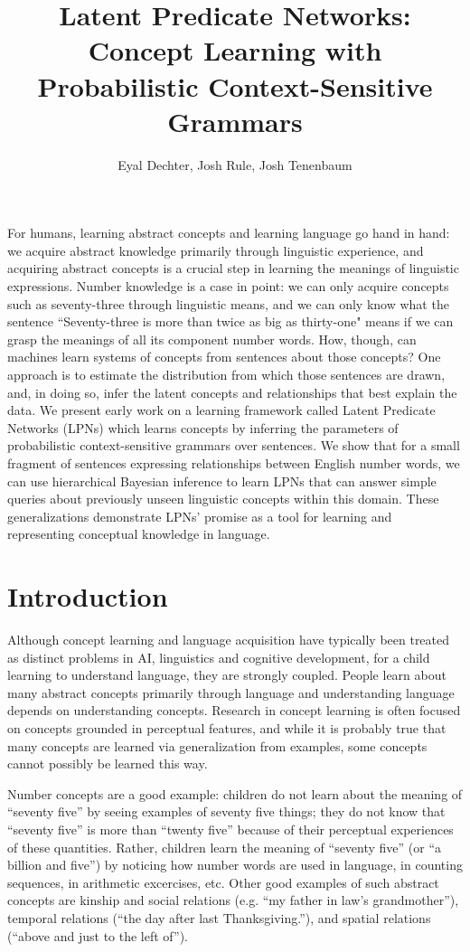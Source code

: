\documentclass[11pt, twocolumn]{article}
\title{Latent Predicate Networks: Concept Learning with Probabilistic Context-Sensitive Grammars}
\author{Eyal Dechter,  Josh Rule, Josh Tenenbaum}
\begin{document}
\vspace{-10cm}
\maketitle

{\small For humans, learning abstract concepts and learning language
  go hand in hand: we acquire abstract knowledge primarily through
  linguistic experience, and acquiring abstract concepts is a crucial
  step in learning the meanings of linguistic expressions. Number
  knowledge is a case in point: we can only acquire concepts such as
  seventy-three through linguistic means, and we can only know what
  the sentence ``Seventy-three is more than twice as big as thirty-one"
  means if we can grasp the meanings of all its component number
  words. How, though, can machines learn systems of concepts from
  sentences about those concepts? One approach is to estimate the
  distribution from which those sentences are drawn, and, in doing so,
  infer the latent concepts and relationships that best explain the
  data. We present early work on a learning framework called Latent
  Predicate Networks (LPNs) which learns concepts by inferring the
  parameters of probabilistic context-sensitive grammars over
  sentences.  We show that for a small fragment of sentences
  expressing relationships between English number words, we can use
  hierarchical Bayesian inference to learn LPNs that can answer simple
  queries about previously unseen linguistic concepts within this
  domain. These generalizations demonstrate LPNs' promise as a tool
  for learning and representing conceptual knowledge in language.}

\section{Introduction}

Although concept learning and language acquisition have typically been
treated as distinct problems in AI, linguistics and cognitive
development, for a child learning to understand language, they are
strongly coupled. People learn about many abstract concepts primarily
through language and understanding language depends on understanding
concepts.  Research in concept learning is often focused on concepts
grounded in perceptual features, and while it is probably true that
many concepts are learned via generalization from examples, some
concepts cannot possibly be learned this way.

Number concepts are a good example: children do not learn about the
meaning of ``seventy five'' by seeing examples of seventy five things;
they do not know that ``seventy five'' is more than ``twenty five''
because of their perceptual experiences of these quantities. Rather,
children learn the meaning of ``seventy five'' (or ``a billion and
five'') by noticing how number words are used in language, in counting
sequences, in arithmetic excercises, etc. Other good examples of such
abstract concepts are kinship and social relations (e.g. ``my father
in law's grandmother''), temporal relations (``the day after last
Thanksgiving.''), and spatial relations (``above and just to the left
of'').
\end{document}
